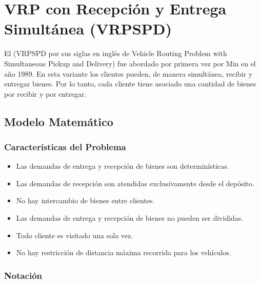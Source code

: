 \section{VRP con Recepción y Entrega Simultánea (VRPSPD)} \label{sect:vrpspd}

El \vrpspd (VRPSPD por sus siglas en inglés de Vehicle Routing Problem with Simultaneous Pickup and Delivery) fue abordado por primera vez por Min \cite{primervrpspd} en el año 1989. En esta variante los clientes pueden, de manera simultánea, recibir y entregar bienes. Por lo tanto, cada cliente tiene asociado una cantidad de bienes por recibir y por entregar. 

\subsection{Modelo Matemático} \label{subsect:vrpspdFor}

\subsubsection{Características del Problema}

\begin{itemize}
\item Las demandas de entrega y recepción de bienes son determinísticas.
\item Las demandas de recepción son atendidas exclusivamente desde el depósito.
\item No hay intercambio de bienes entre clientes.
\item Las demandas de entrega y recepción de bienes no pueden ser divididas.
\item Todo cliente es visitado una sola vez.
\item No hay restricción de distancia máxima recorrida para los vehículos.

\end{itemize}

\subsubsection{Notación}

